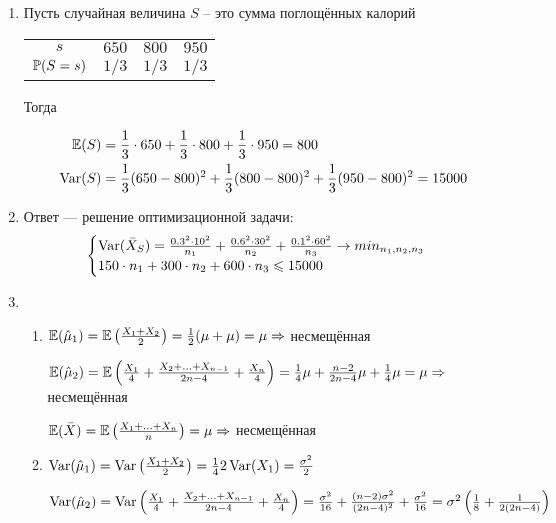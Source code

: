 \begin{enumerate}[resume]
\begin{enumerate}
\item Пусть случайная величина $S$ – это сумма поглощённых калорий

\begin{center}
\begin{tabular}{cccc}
\toprule
$s$ & $650$ & $800$ & $950$ \\
$\P(S=s)$ & $1/3$ & $1/3$ & $1/3$ \\ \bottomrule
\end{tabular}
\end{center}

Тогда

\begin{align*}
\E(S) &= \frac{1}{3}\cdot 650 + \frac{1}{3}\cdot 800 +  \frac{1}{3}\cdot 950 = 800 \\
\Var(S) &= \frac{1}{3}(650-800)^2 + \frac{1}{3}(800-800)^2 + \frac{1}{3}(950-800)^2 = 15000
\end{align*}

\item Ответ — решение оптимизационной задачи:
\[
\begin{cases}
\Var(\bar{X}_S) = \frac{0.3^2\cdot 10^2}{n_1} + \frac{0.6^2 \cdot 30^2}{n_2} + \frac{0.1^2 \cdot 60^2}{n_3} \to min_{n_1, n_2, n_3} \\
150\cdot n_1 + 300 \cdot n_2 + 600 \cdot n_3 \leq 15000
\end{cases}
\]

\item
\begin{enumerate}
\item $\E(\hat \mu_1) = \E\left(\frac{X_1+X_2}{2}\right)  = \frac{1}{2}(\mu+\mu) = \mu \Rightarrow$  несмещённая

$\E(\hat \mu_2) = \E \left(\frac{X_1}{4} + \frac{X_2+\ldots+X_{n-1}}{2n-4} + \frac{X_n}{4}\right) = \frac{1}{4}\mu + \frac{n-2}{2n-4}\mu + \frac{1}{4}\mu = \mu \Rightarrow$ несмещённая

$\E(\bar{X}) = \E\left(\frac{X_1 + \ldots + X_n}{n}\right) = \mu \Rightarrow$ несмещённая

\item $\Var(\hat \mu_1) = \Var\left(\frac{X_1+X_2}{2}\right)  = \frac{1}{4}2\Var(X_1) = \frac{\sigma^2}{2}$

$\Var(\hat \mu_2) = \Var \left(\frac{X_1}{4} + \frac{X_2+\ldots+X_{n-1}}{2n-4} + \frac{X_n}{4}\right)  = \frac{\sigma^2}{16} + \frac{(n-2)\sigma^2}{(2n-4)^2} + \frac{\sigma^2}{16} = \sigma^2\left(\frac{1}{8} + \frac{1}{2(2n-4)} \right)$


\end{enumerate}
\end{enumerate}
\end{enumerate}
